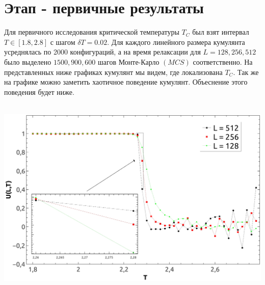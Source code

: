 \documentclass[12pt,a4paper]{article}
\begin{document}
	\section{Этап - первичные результаты}
	Для первичного исследования критической температуры $ T_C$
	был взят интервал $T \in [1.8, 2.8]$ с шагом $\delta T = 0.02$. Для каждого линейного размера кумулянта усреднялась по 2000 конфигураций, а на время релаксации для $L = 128, 256, 512$ было выделено $1500, 900, 600$ шагов Монте-Карло $(MCS)$ соответственно. На представленных ниже графиках кумулянт мы видем,
	где локализована  $T_C$. Так же на графике можно заметить хаотичное поведение кумулянт. Объеснение этого поведения будет ниже.
	\begin{center}
	\mbox{
		\includegraphics[scale=0.4]{U(L,T)}
	} 
	\end{center}
\end{document}
